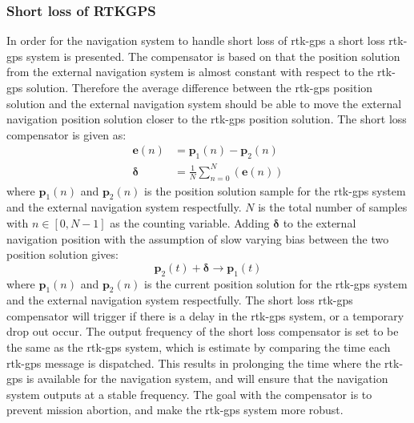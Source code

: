 \subsubsection{Short loss of RTKGPS}\label{ss:ShortLoss}
In order for the navigation system to handle short loss of \gls{rtk-gps} a short loss \gls{rtk-gps} system is presented. The compensator is based on that the position solution from the external navigation system is almost constant with respect to the \gls{rtk-gps} solution. Therefore the average difference between the \gls{rtk-gps} position solution and the external navigation system should be able to move the external navigation position solution closer to the \gls{rtk-gps} position solution. The short loss compensator is given as:
\begin{align}
\mathbf{e}(n) &= \mathbf{p}_1(n) - \mathbf{p}_2(n)\\
\mathbf{\delta} &= \frac{1}{N}\sum_{n=0}^N(\mathbf{e}(n))
\end{align}
where $\mathbf{p}_1(n)$ and $\mathbf{p}_2(n)$ is the position solution sample for the \gls{rtk-gps} system and the external navigation system respectfully. $N$ is the total number of samples with $n\in [0,N-1]$ as the counting variable. Adding $\mathbf{\delta}$ to the external navigation position with the assumption of slow varying bias between the two position solution gives:
\begin{equation}
\mathbf{p}_2(t) + \mathbf{\delta} \rightarrow \mathbf{p}_1(t)
\end{equation}
where $\mathbf{p}_1(n)$ and $\mathbf{p}_2(n)$ is the current position solution for the \gls{rtk-gps} system and the external navigation system respectfully. The short loss \gls{rtk-gps} compensator will trigger if there is a delay in the \gls{rtk-gps} system, or a temporary drop out occur. The output frequency of the short loss compensator is set to be the same as the \gls{rtk-gps} system, which is estimate by comparing the time each \gls{rtk-gps} message is dispatched. This results in prolonging the time where the \gls{rtk-gps} is available for the navigation system, and will ensure that the navigation system outputs at a stable frequency. The goal with the compensator is to prevent mission abortion, and make the \gls{rtk-gps} system more robust.